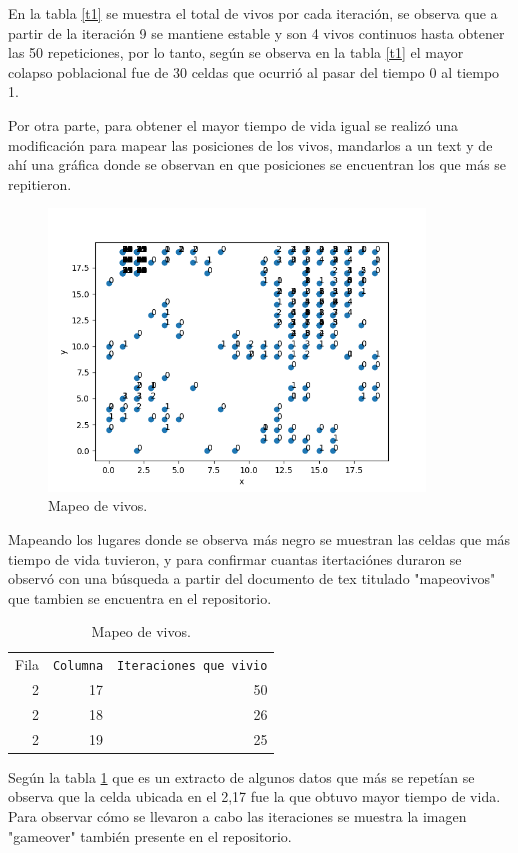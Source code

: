 \documentclass{article}
\begin{document}
En la tabla \ref{t1} se muestra el total de vivos por cada iteraci\'on, se observa que a partir de la iteraci\'on 9 se mantiene estable y son 4 vivos continuos hasta obtener las 50 repeticiones, por lo tanto, seg\'un se observa en la tabla \ref{t1} el mayor colapso poblacional fue de 30 celdas que ocurri\'o al pasar del tiempo 0 al tiempo 1.

Por otra parte, para obtener el mayor tiempo de vida igual se realiz\'o una modificaci\'on para mapear las posiciones de los vivos, mandarlos a un text y de ah\'i una gr\'afica donde se observan en que posiciones se encuentran los que m\'as se repitieron.

\begin{figure}
  \begin{center}
    \includegraphics[width=10cm]{posiciones.png}
  \end{center}
  \caption{Mapeo de vivos.}
  \label{f1}
\end{figure}

Mapeando los lugares donde se observa m\'as negro se muestran las celdas que m\'as tiempo de vida tuvieron, y para confirmar cuantas itertaci\'ones duraron se observ\'o con una b\'usqueda a partir del documento de tex \cite{ana} titulado "mapeovivos" que tambien se encuentra en el repositorio.

\begin{table}
  \caption{Mapeo de vivos.}
  \label{t2}
  \begin{center}
    \begin{tabular}{rrr}
      Fila & \texttt{Columna} & \texttt{Iteraciones que vivio} \\
      2 &  17    & 50     \\
      2  &  18   &  26    \\
      2  &  19    & 25   
    \end{tabular}
    \end{center}
  \end{table}
Seg\'un la tabla \ref{t2} que es un extracto de algunos datos que m\'as se repet\'ian se observa que la celda ubicada en el 2,17 fue la que obtuvo mayor tiempo de vida.
Para observar c\'omo se llevaron a cabo las iteraciones se muestra la imagen \cite{ana} "gameover" tambi\'en presente en el repositorio.
\end{document}
